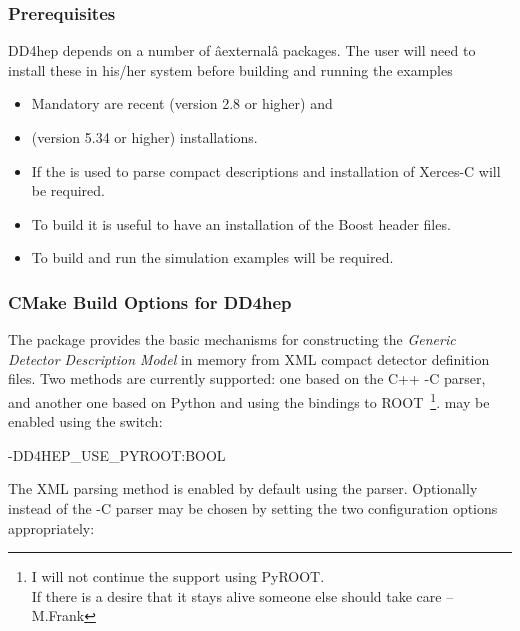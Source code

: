 \documentclass[10pt,a4paper]{article}
\begin{document}
\subsubsection{Prerequisites}
\label{sec:dd4hep-user-manual-prerequisites}
\noindent
DD4hep depends on a number of âexternalâ packages. 
The user will need to install these in his/her 
system before building and running the examples
\begin{itemize}\itemcompact
\item Mandatory are recent  (version 2.8 or higher) and 
\item {} (version 5.34 or higher) installations.
\item If the  is used to parse compact descriptions and 
        installation of {Xerces-C} will be required.
\item To build \DDG it is useful to have an installation of the Boost
    header files.
\item To build and run the simulation examples  will be required. 
\end{itemize}

\newpage
\subsubsection{CMake Build Options for DD4hep}
\label{sec:dd4hep-user-manual-building}
\noindent
The package provides the basic mechanisms for constructing the 
{\it{Generic Detector Description Model}} in memory from XML compact detector 
definition files. Two methods are currently supported: one based
on the C++ -C parser, and another one based on Python and using the 
 bindings to ROOT~\footnote{I will not continue 
the support using PyROOT. \\
If there is a desire that it stays alive 
someone else should take care -- M.Frank}. 
 may be enabled using the switch:

\begin{unnumberedcode}
    -DD4HEP_USE_PYROOT:BOOL
\end{unnumberedcode}

\noindent
The XML parsing method is enabled by default using the  parser. Optionally 
instead of  the -C  parser may be chosen by setting the 
two configuration options appropriately:
\end{document}

